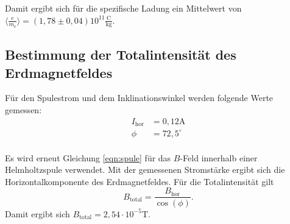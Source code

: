 Damit ergibt sich für die spezifische Ladung ein Mittelwert von $\langle\frac{e}{m_\mathrm{e}}\rangle=(1,78 \pm 0,04)10^11 \frac{\si{\coulomb}}{\si{\kilo\gram}}$.

\subsection{Bestimmung der Totalintensität des Erdmagnetfeldes}
Für den Spulestrom und dem Inklinationswinkel werden folgende Werte gemessen:
\begin{align}
  I_\mathrm{hor}&=0,12 \si{\ampere}\\
  \phi &= 72,5^\circ \\
\end{align}

Es wird erneut Gleichung \eqref{eqn:spule} für das $B$-Feld innerhalb einer Helmholtzspule verwendet. Mit der gemessenen Stromstärke ergibt sich die Horizontalkomponente des Erdmagnetfeldes. Für die Totalintensität gilt
\begin{equation}
  B_\mathrm{total}=\frac{B_\mathrm{hor}}{\cos(\phi)}.
\end{equation}
Damit ergibt sich $B_\mathrm{total}=2,54 \cdot 10^{-5}\si{\tesla}$.
